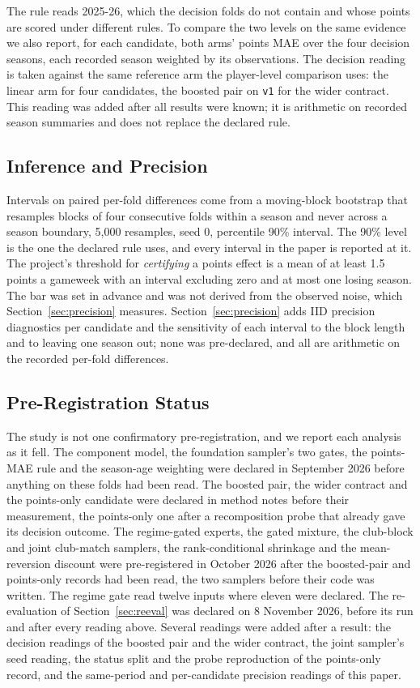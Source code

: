 \documentclass[11pt,a4paper]{article}
\begin{document}
The rule reads 2025-26, which the decision folds do not contain and whose points are scored under different rules. To compare the two levels on the same evidence we also report, for each candidate, both arms' points MAE over the four decision seasons, each recorded season weighted by its observations. The decision reading is taken against the same reference arm the player-level comparison uses: the linear arm for four candidates, the boosted pair on \texttt{v1} for the wider contract. This reading was added after all results were known; it is arithmetic on recorded season summaries and does not replace the declared rule.

\subsection{Inference and Precision}

Intervals on paired per-fold differences come from a moving-block bootstrap \cite{kunsch1989} that resamples blocks of four consecutive folds within a season and never across a season boundary, 5{,}000 resamples, seed 0, percentile 90\% interval. The 90\% level is the one the declared rule uses, and every interval in the paper is reported at it. The project's threshold for \emph{certifying} a points effect is a mean of at least 1.5 points a gameweek with an interval excluding zero and at most one losing season. The bar was set in advance and was not derived from the observed noise, which Section~\ref{sec:precision} measures. Section~\ref{sec:precision} adds IID precision diagnostics per candidate and the sensitivity of each interval to the block length and to leaving one season out; none was pre-declared, and all are arithmetic on the recorded per-fold differences.

\subsection{Pre-Registration Status}
\label{sec:prereg}

The study is not one confirmatory pre-registration, and we report each analysis as it fell. The component model, the foundation sampler's two gates, the points-MAE rule and the season-age weighting were declared in September 2026 before anything on these folds had been read. The boosted pair, the wider contract and the points-only candidate were declared in method notes before their measurement, the points-only one after a recomposition probe that already gave its decision outcome. The regime-gated experts, the gated mixture, the club-block and joint club-match samplers, the rank-conditional shrinkage and the mean-reversion discount were pre-registered in October 2026 after the boosted-pair and points-only records had been read, the two samplers before their code was written. The regime gate read twelve inputs where eleven were declared. The re-evaluation of Section~\ref{sec:reeval} was declared on 8 November 2026, before its run and after every reading above. Several readings were added after a result: the decision readings of the boosted pair and the wider contract, the joint sampler's seed reading, the status split and the probe reproduction of the points-only record, and the same-period and per-candidate precision readings of this paper.
\end{document}
